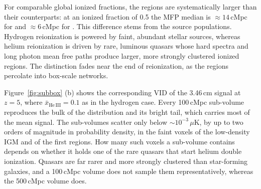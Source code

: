 For comparable global ionized fractions, the  regions are systematically larger than their  counterparts: at an ionized fraction of 0.5 the MFP median is $\approx 14$\,cMpc for  and $\approx 6$\,cMpc for . This difference stems from the source populations. Hydrogen reionization is powered by faint, abundant stellar sources, whereas helium reionization is driven by rare, luminous quasars whose hard spectra and long photon mean free paths produce larger, more strongly clustered ionized regions. The distinction fades near the end of reionization, as the regions percolate into box-scale networks.



Figure~\ref{fig:subbox} (b) shows the corresponding VID of the 3.46\,cm signal at $z = 5$, where $\bar{x}_\mathrm{He\,III} = 0.1$ as in the hydrogen case. Every 100\,cMpc sub-volume reproduces the bulk of the distribution and its bright tail, which carries most of the mean signal. The sub-volumes scatter only below $\sim 10^{-3}\,\mu\mathrm{K}$, by up to two orders of magnitude in probability density, in the faint voxels of the low-density IGM and of the first  regions. How many such voxels a sub-volume contains depends on whether it holds one of the rare quasars that start helium double ionization. Quasars are far rarer and more strongly clustered than star-forming galaxies, and a 100\,cMpc volume does not sample them representatively, whereas the 500\,cMpc \lumina volume does.

